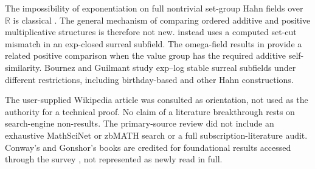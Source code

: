 \documentclass[11pt,letterpaper]{article}
\numberwithin{equation}{section}
\theoremstyle{definition}
\theoremstyle{remark}
\newcommand{\R}{\mathbb R}
\begin{document}
The impossibility of exponentiation on full nontrivial set-group Hahn fields over $\R$ is classical \cite{KKS}. The general mechanism of comparing ordered additive and positive multiplicative structures is therefore not new.  instead uses a computed set-cut mismatch in an exp-closed surreal subfield. The omega-field results in \cite{BKMM} provide a related positive comparison when the value group has the required additive self-similarity. Bournez and Guilmant \cite{BG} study exp--log stable surreal subfields under different restrictions, including birthday-based and other Hahn constructions.

The user-supplied Wikipedia article \cite{Wikipedia} was consulted as orientation, not used as the authority for a technical proof. No claim of a literature breakthrough rests on search-engine non-results. The primary-source review did not include an exhaustive MathSciNet or zbMATH search or a full subscription-literature audit. Conway's and Gonshor's books \cite{Conway,Gonshor} are credited for foundational results accessed through the survey \cite{MM}, not represented as newly read in full.
\end{document}
